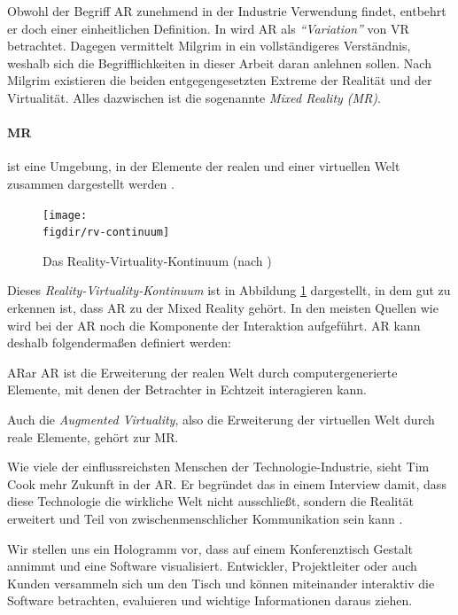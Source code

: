 Obwohl der Begriff AR zunehmend in der Industrie Verwendung findet, entbehrt er doch einer einheitlichen Definition. In \cite{azuma1997survey} wird AR als \emph{"`Variation"'} von VR betrachtet. Dagegen vermittelt Milgrim in \cite{milgram1995augmented} ein vollständigeres Verständnis, weshalb sich die Begrifflichkeiten in dieser Arbeit daran anlehnen sollen. Nach Milgrim existieren die beiden entgegengesetzten Extreme der Realität und der Virtualität. Alles dazwischen ist die sogenannte \emph{Mixed Reality (MR)}.

\paragraph{MR} ist eine Umgebung, in der Elemente der realen und einer virtuellen Welt zusammen dargestellt werden \cite{kato1999marker}.\\

\begin{figure}[htb]
  \texttt{[image: \\figdir/rv-continuum]}
  \caption{Das Reality-Virtuality-Kontinuum (nach \cite{milgram1995augmented})}
  \label{fig:rv-continuum}
\end{figure}

Dieses \emph{Reality-Virtuality-Kontinuum} ist in Abbildung \ref{fig:rv-continuum} dargestellt, in dem gut zu erkennen ist, dass AR zu der Mixed Reality gehört. In den meisten Quellen wie \cite{azuma1997survey, azuma2001recent, kato1999marker} wird bei der AR noch die Komponente der Interaktion aufgeführt. AR kann deshalb folgendermaßen definiert werden:

\begin{defbox}{AR}{ar}
   AR ist die Erweiterung der realen Welt durch computergenerierte Elemente, mit denen der Betrachter in Echtzeit interagieren kann.
\end{defbox}

Auch die \emph{Augmented Virtuality}, also die Erweiterung der virtuellen Welt durch reale Elemente, gehört zur MR.

Wie viele der einflussreichsten Menschen der Technologie-Industrie, sieht Tim Cook mehr Zukunft in der AR. Er begründet das in einem Interview damit, dass diese Technologie die wirkliche Welt nicht ausschließt, sondern die Realität erweitert und Teil von zwischenmenschlicher Kommunikation sein kann \cite{theindependent2017apple}.

Wir stellen uns ein Hologramm vor, dass auf einem Konferenztisch Gestalt annimmt und eine Software visualisiert. Entwickler, Projektleiter oder auch Kunden versammeln sich um den Tisch und können miteinander interaktiv die Software betrachten, evaluieren und wichtige Informationen daraus ziehen.

